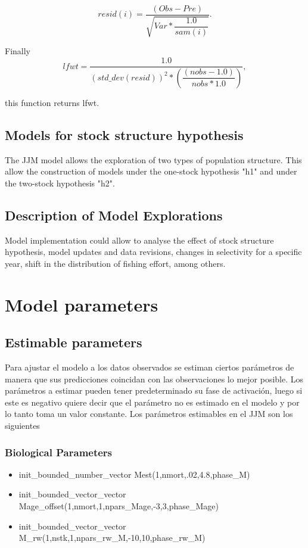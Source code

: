 \documentclass{article}
\begin{document}
\begin{equation}
    resid(i) = \dfrac{(Obs - Pre)}{\sqrt{Var * \dfrac{1.0}{ sam(i) }}}.
\end{equation}

Finally
\begin{equation}
     lfwt = \dfrac{1.0}{ (std\_dev(resid))^2 * \left(\dfrac{(nobs - 1.0)}{nobs * 1.0}\right)},
\end{equation}

this function returns lfwt.

\subsection{Models for stock structure hypothesis}

The JJM model allows the exploration of two types of population structure. This allow the construction of models under the one-stock hypothesis "h1" and under the two-stock hypothesis "h2".

\subsection{Description of Model Explorations}

Model implementation could allow to analyse the effect of stock structure hypothesis, model updates and data revisions, changes in selectivity for a specific year, shift in the distribution of fishing effort, among others. 

\section{Model parameters}
\subsection{Estimable parameters}
Para ajustar el modelo a los datos observados se estiman ciertos parámetros de manera que sus predicciones coincidan con las observaciones lo mejor posible. Los parámetros a estimar pueden tener predeterminado su fase de activación, luego si este es negativo quiere decir que el parámetro no es estimado en el modelo y por lo tanto toma un valor constante. Los parámetros estimables en el JJM son los siguientes 
\subsubsection{Biological Parameters}
\begin{itemize}
    \item init\_bounded\_number\_vector Mest(1,nmort,.02,4.8,phase\_M)
    \item init\_bounded\_vector\_vector Mage\_offset(1,nmort,1,npars\_Mage,-3,3,phase\_Mage)
    \item  init\_bounded\_vector\_vector M\_rw(1,nstk,1,npars\_rw\_M,-10,10,phase\_rw\_M)
\end{itemize}
\end{document}
